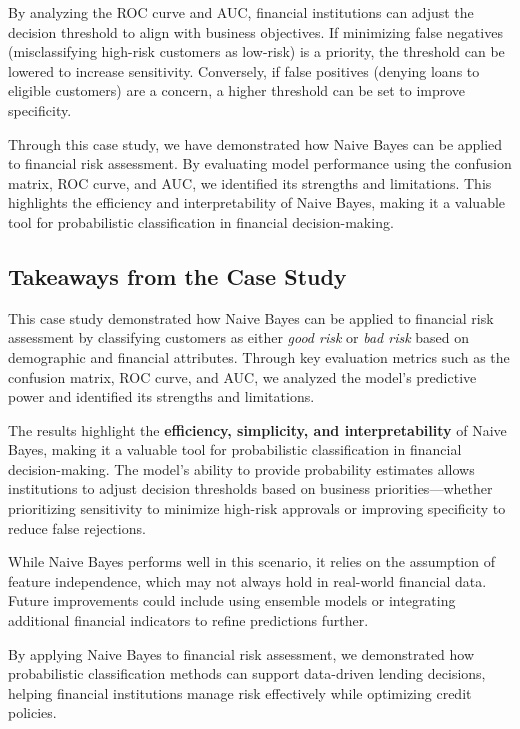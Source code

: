 \documentclass[
  11pt,
]{book}
\theoremstyle{definition}
\theoremstyle{definition}
\theoremstyle{definition}
\theoremstyle{definition}
\theoremstyle{remark}
\begin{document}
By analyzing the ROC curve and AUC, financial institutions can adjust the decision threshold to align with business objectives. If minimizing false negatives (misclassifying high-risk customers as low-risk) is a priority, the threshold can be lowered to increase sensitivity. Conversely, if false positives (denying loans to eligible customers) are a concern, a higher threshold can be set to improve specificity.

Through this case study, we have demonstrated how Naive Bayes can be applied to financial risk assessment. By evaluating model performance using the confusion matrix, ROC curve, and AUC, we identified its strengths and limitations. This highlights the efficiency and interpretability of Naive Bayes, making it a valuable tool for probabilistic classification in financial decision-making.

\subsection*{Takeaways from the Case Study}\label{takeaways-from-the-case-study}


This case study demonstrated how Naive Bayes can be applied to financial risk assessment by classifying customers as either \emph{good risk} or \emph{bad risk} based on demographic and financial attributes. Through key evaluation metrics such as the confusion matrix, ROC curve, and AUC, we analyzed the model's predictive power and identified its strengths and limitations.

The results highlight the \textbf{efficiency, simplicity, and interpretability} of Naive Bayes, making it a valuable tool for probabilistic classification in financial decision-making. The model's ability to provide probability estimates allows institutions to adjust decision thresholds based on business priorities---whether prioritizing sensitivity to minimize high-risk approvals or improving specificity to reduce false rejections.

While Naive Bayes performs well in this scenario, it relies on the assumption of feature independence, which may not always hold in real-world financial data. Future improvements could include using ensemble models or integrating additional financial indicators to refine predictions further.

By applying Naive Bayes to financial risk assessment, we demonstrated how probabilistic classification methods can support data-driven lending decisions, helping financial institutions manage risk effectively while optimizing credit policies.
\end{document}
